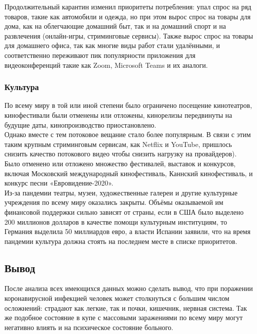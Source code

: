 \documentclass[a4paper, 12pt]{extarticle}
\begin{document}
Продолжительный карантин изменил приоритеты потребления: упал спрос на ряд
товаров, такие как автомобили и одежда, но при этом вырос спрос на товары для
дома, как на облегчающие домашний быт, так и на домашний спорт и на развлечения
(онлайн-игры, стриминговые сервисы). Также вырос спрос на товары для домашнего
офиса, так как многие виды работ стали удалёнными, и соответственно переживают
пик популярности приложения для видеоконференций такие как Zoom, Microsoft
Teams и их аналоги.

\subsubsection{Культура}
По всему миру в той или иной степени было ограничено посещение кинотеатров,
кинофестивали были отменены или отложены, кинорелизы передвинуты на будущие
даты, кинопроизводство приостановлено.
\\

Однако вместе с тем потоковое вещание стало более популярным. В связи с этим
таким крупным стриминговым сервисам, как Netflix и YouTube, пришлось снизить качество потокового видео чтобы
снизить нагрузку на провайдеров).
\\

Было отменено или отложено множество фестивалей, выставок и конкурсов, включая
Московский международный кинофестиваль, Каннский кинофестиваль, и конкурс песни
«Евровидение-2020».
\\

Из-за пандемии театры, музеи, художественные галереи и другие культурные
учреждения по всему миру оказались закрыты. Объёмы оказываемой им финансовой
поддержки сильно зависят от страны, если в США было выделено 200 миллионов
долларов в качестве помощи культурным институциям, то Германия выделила 50
миллиардов евро, а власти Испании заявили, что на время пандемии культура
должна стоять на последнем месте в списке приоритетов.
\newpage

\subsection{Вывод}
После анализа всех имеющихся данных можно сделать вывод, что
при поражении коронавирусной инфекцией человек может столкнуться с большим числом
осложнений: страдают как легкие, так и почки, кишечник, нервная система. Так же
подобное состояние в купе с массовыми заражениями по всему миру могут негативно
влиять и на психическое состояние больного.
\\
\end{document}
